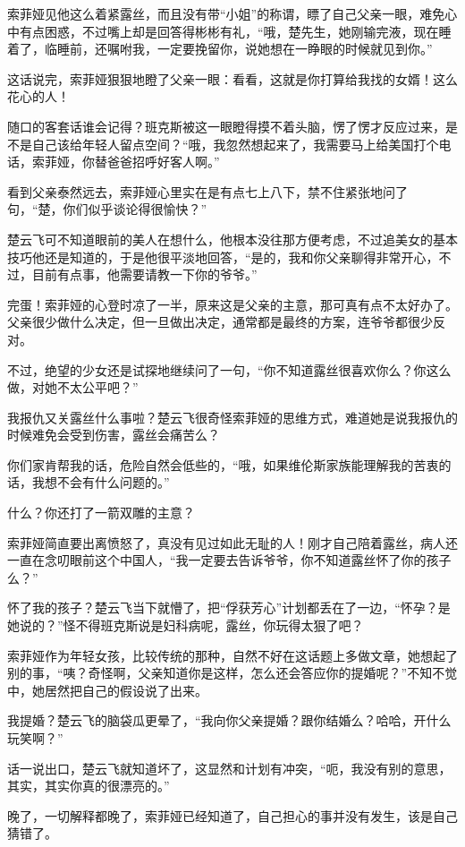 索菲娅见他这么着紧露丝，而且没有带“小姐”的称谓，瞟了自己父亲一眼，难免心中有点困惑，不过嘴上却是回答得彬彬有礼，“哦，楚先生，她刚输完液，现在睡着了，临睡前，还嘱咐我，一定要挽留你，说她想在一睁眼的时候就见到你。”

这话说完，索菲娅狠狠地瞪了父亲一眼：看看，这就是你打算给我找的女婿！这么花心的人！

随口的客套话谁会记得？班克斯被这一眼瞪得摸不着头脑，愣了愣才反应过来，是不是自己该给年轻人留点空间？“哦，我忽然想起来了，我需要马上给美国打个电话，索菲娅，你替爸爸招呼好客人啊。”

看到父亲泰然远去，索菲娅心里实在是有点七上八下，禁不住紧张地问了句，“楚，你们似乎谈论得很愉快？”

楚云飞可不知道眼前的美人在想什么，他根本没往那方便考虑，不过追美女的基本技巧他还是知道的，于是他很平淡地回答，“是的，我和你父亲聊得非常开心，不过，目前有点事，他需要请教一下你的爷爷。”

完蛋！索菲娅的心登时凉了一半，原来这是父亲的主意，那可真有点不太好办了。父亲很少做什么决定，但一旦做出决定，通常都是最终的方案，连爷爷都很少反对。

不过，绝望的少女还是试探地继续问了一句，“你不知道露丝很喜欢你么？你这么做，对她不太公平吧？”

我报仇又关露丝什么事啦？楚云飞很奇怪索菲娅的思维方式，难道她是说我报仇的时候难免会受到伤害，露丝会痛苦么？

你们家肯帮我的话，危险自然会低些的，“哦，如果维伦斯家族能理解我的苦衷的话，我想不会有什么问题的。”

什么？你还打了一箭双雕的主意？

索菲娅简直要出离愤怒了，真没有见过如此无耻的人！刚才自己陪着露丝，病人还一直在念叨眼前这个中国人，“我一定要去告诉爷爷，你不知道露丝怀了你的孩子么？”

怀了我的孩子？楚云飞当下就懵了，把“俘获芳心”计划都丢在了一边，“怀孕？是她说的？”怪不得班克斯说是妇科病呢，露丝，你玩得太狠了吧？

索菲娅作为年轻女孩，比较传统的那种，自然不好在这话题上多做文章，她想起了别的事，“咦？奇怪啊，父亲知道你是这样，怎么还会答应你的提婚呢？”不知不觉中，她居然把自己的假设说了出来。

我提婚？楚云飞的脑袋瓜更晕了，“我向你父亲提婚？跟你结婚么？哈哈，开什么玩笑啊？”

话一说出口，楚云飞就知道坏了，这显然和计划有冲突，“呃，我没有别的意思，其实，其实你真的很漂亮的。”

晚了，一切解释都晚了，索菲娅已经知道了，自己担心的事并没有发生，该是自己猜错了。

